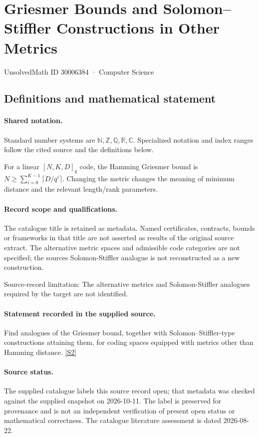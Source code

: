 \documentclass[11pt]{article}
\newcommand{\sref}[2]{\hyperlink{source:#1:#2}{[S#2]}}
\begin{document}
\setcounter{section}{30006383}
\section{Griesmer Bounds and Solomon–Stiffler Constructions in Other Metrics}\label{30006384}
{\small\sffamily UnsolvedMath ID 30006384 · Computer Science}
\subsection{Definitions and mathematical statement}

\paragraph{Shared notation.}Standard number systems are $\mathbb N,\mathbb Z,\mathbb Q,\mathbb R,\mathbb C$. Specialized notation and index ranges follow the cited source and the definitions below.


For a linear $[N,K,D]_q$ code, the Hamming Griesmer bound is $N\geq\sum_{i=0}^{K-1}\lceil D/q^i\rceil$. Changing the metric changes the meaning of minimum distance and the relevant length/rank parameters.
\paragraph{Record scope and qualifications.}
The catalogue title is retained as metadata. Named certificates, contracts, bounds or frameworks in that title are not asserted as results of the original source extract.
The alternative metric spaces and admissible code categories are not specified; the source\textquotesingle s Solomon-Stiffler analogue is not reconstructed as a new construction.

Source-record limitation: The alternative metrics and Solomon-Stiffler analogues required by the target are not identified.
\paragraph{Statement recorded in the supplied source.}
Find analogues of the Griesmer bound, together with Solomon–Stiffler-type constructions attaining them, for coding spaces equipped with metrics other than Hamming distance. \sref{30006384}{2}
\paragraph{Source status.}
The supplied catalogue labels this source record open; that metadata was checked against the supplied snapshot on 2026-10-11. The label is preserved for provenance and is not an independent verification of present open status or mathematical correctness. The catalogue literature assessment is dated 2026-08-22.
\end{document}
